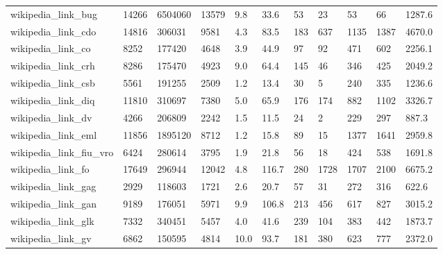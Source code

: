 \begin{longtable}{lllllllllll}
 wikipedia\_link\_bug                                 & 14266      & 6504060   & 13579 & 9.8    & 33.6   & 53    & 23     & 53     & 66     & 1287.6  \\
 wikipedia\_link\_cdo                                 & 14816      & 306031    & 9581  & 4.3    & 83.5   & 183   & 637    & 1135   & 1387   & 4670.0  \\
 wikipedia\_link\_co                                  & 8252       & 177420    & 4648  & 3.9    & 44.9   & 97    & 92     & 471    & 602    & 2256.1  \\
 wikipedia\_link\_crh                                 & 8286       & 175470    & 4923  & 9.0    & 64.4   & 145   & 46     & 346    & 425    & 2049.2  \\
 wikipedia\_link\_csb                                 & 5561       & 191255    & 2509  & 1.2    & 13.4   & 30    & 5      & 240    & 335    & 1236.6  \\
 wikipedia\_link\_diq                                 & 11810      & 310697    & 7380  & 5.0    & 65.9   & 176   & 174    & 882    & 1102   & 3326.7  \\
 wikipedia\_link\_dv                                  & 4266       & 206809    & 2242  & 1.5    & 11.5   & 24    & 2      & 229    & 297    & 887.3   \\
 wikipedia\_link\_eml                                 & 11856      & 1895120   & 8712  & 1.2    & 15.8   & 89    & 15     & 1377   & 1641   & 2959.8  \\
 wikipedia\_link\_fiu\_vro                             & 6424       & 280614    & 3795  & 1.9    & 21.8   & 56    & 18     & 424    & 538    & 1691.8  \\
 wikipedia\_link\_fo                                  & 17649      & 296944    & 12042 & 4.8    & 116.7  & 280   & 1728   & 1707   & 2100   & 6675.2  \\
 wikipedia\_link\_gag                                 & 2929       & 118603    & 1721  & 2.6    & 20.7   & 57    & 31     & 272    & 316    & 622.6   \\
 wikipedia\_link\_gan                                 & 9189       & 176051    & 5971  & 9.9    & 106.8  & 213   & 456    & 617    & 827    & 3015.2  \\
 wikipedia\_link\_glk                                 & 7332       & 340451    & 5457  & 4.0    & 41.6   & 239   & 104    & 383    & 442    & 1873.7  \\
 wikipedia\_link\_gv                                  & 6862       & 150595    & 4814  & 10.0   & 93.7   & 181   & 380    & 623    & 777    & 2372.0  \\

\end{longtable}
